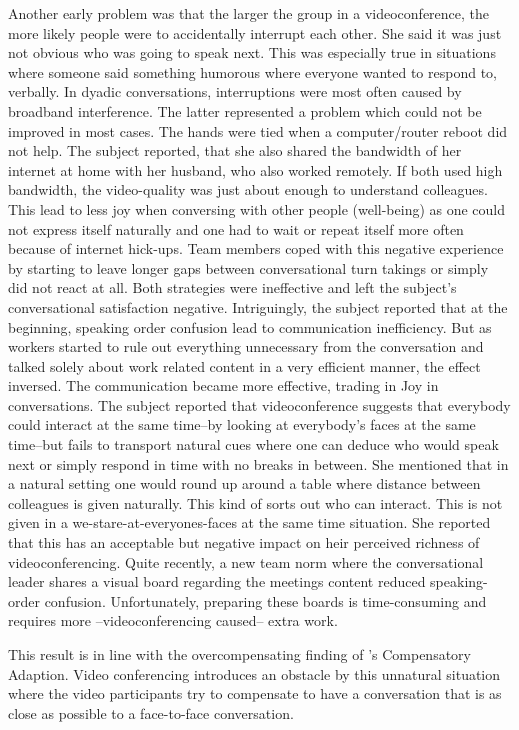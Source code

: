 \documentclass[man]{apa7}
\begin{document}
Another early problem was that the larger the group in a videoconference, the more likely people were to accidentally interrupt each other. She said it was just not obvious who was going to speak next. This was especially true in situations where someone said something humorous where everyone wanted to respond to, verbally. In dyadic conversations, interruptions were most often caused by broadband interference. The latter represented a problem which could not be improved in most cases. The hands were tied when a computer/router reboot did not help. The subject reported, that she also shared the bandwidth of her internet at home with her husband, who also worked remotely. If both used high bandwidth, the video-quality was just about enough to understand colleagues. This lead to less joy when conversing with other people (well-being) as one could not express itself naturally and one had to wait or repeat itself more often because of internet hick-ups. Team members coped with this negative experience by starting to leave longer gaps between conversational turn takings or simply did not react at all. Both strategies were ineffective and left the subject's conversational satisfaction negative. Intriguingly, the subject reported that at the beginning, speaking order confusion lead to communication inefficiency. But as workers started to rule out everything unnecessary from the conversation and talked solely about work related content in a very efficient manner, the effect inversed. The communication became more effective, trading in Joy in conversations. The subject reported that videoconference suggests that everybody could interact at the same time–by looking at everybody's faces at the same time–but fails to transport natural cues where one can deduce who would speak next or simply respond in time with no breaks in between. She mentioned that in a natural setting one would round up around a table where distance between colleagues is given naturally. This kind of sorts out who can interact. This is not given in a we-stare-at-everyones-faces at the same time situation. She reported that this has an acceptable but negative impact on heir perceived richness of videoconferencing. Quite recently, a new team norm where the conversational leader shares a visual board regarding the meetings content reduced speaking-order confusion. Unfortunately, preparing these boards is time-consuming and requires more –videoconferencing caused– extra work.

This result is in line with the overcompensating finding of \citeauthor{Kock2005}'s Compensatory Adaption. Video conferencing introduces an obstacle by this unnatural situation where the video participants try to compensate to have a conversation that is as close as possible to a face-to-face conversation.
\end{document}
